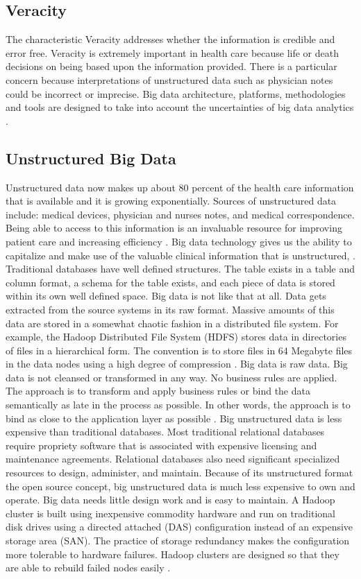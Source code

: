 \documentclass[sigconf]{acmart}
\begin{document}
\subsection{Veracity}

The characteristic Veracity addresses whether the information is credible and error free. Veracity is extremely important in health care because life or death decisions on being based upon the information provided. There is a particular concern because interpretations of unstructured data such as physician notes could be incorrect or imprecise. Big data architecture, platforms, methodologies and tools are designed to take into account the uncertainties of big data analytics \cite{springer}. 

\subsection{Unstructured Big Data}
Unstructured data now makes up about 80 percent of the health care information that is available and it is growing exponentially.  Sources of unstructured data include: medical devices, physician and nurses notes, and medical correspondence.  Being able to access to this information is an invaluable resource for improving patient care and increasing efficiency \cite{www-google-McDonald}.  Big data technology gives us the ability to capitalize and make use of the valuable clinical information that is unstructured, \cite{www-google-HlthCat}.  
Traditional databases have well defined structures. The table exists in a table and column format, a schema for the table exists, and each piece of data is stored within its own well defined space.  Big data is not like that at all.  Data gets extracted from the source systems in its raw format.  Massive amounts of this data are stored in a somewhat chaotic fashion in a distributed file system.  For example, the Hadoop Distributed File System (HDFS) stores data in directories of files in a hierarchical form. The convention is to store files in 64 Megabyte files in the data nodes using a high degree of compression \cite{www-google-HlthCat}. 
Big data is raw data. Big data is not cleansed or transformed in any way. No business rules are applied. The approach is to transform and apply business rules or bind the data semantically as late in the process as possible.  In other words, the approach is to bind as close to the application layer as possible \cite{www-google-HlthCat}.
Big unstructured data is less expensive than traditional databases. Most traditional relational databases require propriety software that is associated with expensive licensing and maintenance agreements.  Relational databases also need significant specialized resources to design, administer, and maintain. Because of its unstructured format the open source concept, big unstructured data is much less expensive to own and operate. Big data needs little design work and is easy to maintain. A Hadoop cluster is built using inexpensive commodity hardware and run on traditional disk drives using a directed attached (DAS) configuration instead of an expensive storage area (SAN).  The practice of storage redundancy makes the configuration more tolerable to hardware failures.  Hadoop clusters are designed so that they are able to rebuild failed nodes easily \cite{www-google-HlthCat}.  
\end{document}
